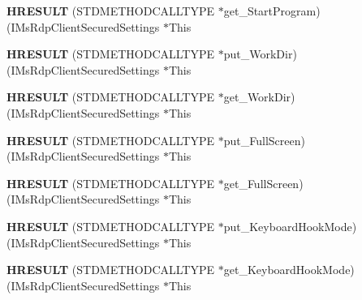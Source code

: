 \begin{DoxyCompactItemize}
{\bfseries H\+R\+E\+S\+U\+LT} (S\+T\+D\+M\+E\+T\+H\+O\+D\+C\+A\+L\+L\+T\+Y\+PE $\ast$get\+\_\+\+Start\+Program)(I\+Ms\+Rdp\+Client\+Secured\+Settings $\ast$This
\item 
\mbox{\label{struct_i_ms_rdp_client_secured_settings_vtbl_ac2a3462f8e8e1c1a7678fccba9072e39}} 
{\bfseries H\+R\+E\+S\+U\+LT} (S\+T\+D\+M\+E\+T\+H\+O\+D\+C\+A\+L\+L\+T\+Y\+PE $\ast$put\+\_\+\+Work\+Dir)(I\+Ms\+Rdp\+Client\+Secured\+Settings $\ast$This
\item 
\mbox{\label{struct_i_ms_rdp_client_secured_settings_vtbl_a52e1cd0fb7b14af48fbd1a7527a0b95c}} 
{\bfseries H\+R\+E\+S\+U\+LT} (S\+T\+D\+M\+E\+T\+H\+O\+D\+C\+A\+L\+L\+T\+Y\+PE $\ast$get\+\_\+\+Work\+Dir)(I\+Ms\+Rdp\+Client\+Secured\+Settings $\ast$This
\item 
\mbox{\label{struct_i_ms_rdp_client_secured_settings_vtbl_a1d6c095d501772f9c8d80d0cd5cbfc59}} 
{\bfseries H\+R\+E\+S\+U\+LT} (S\+T\+D\+M\+E\+T\+H\+O\+D\+C\+A\+L\+L\+T\+Y\+PE $\ast$put\+\_\+\+Full\+Screen)(I\+Ms\+Rdp\+Client\+Secured\+Settings $\ast$This
\item 
\mbox{\label{struct_i_ms_rdp_client_secured_settings_vtbl_a968e461d61add785407203ec1afaa147}} 
{\bfseries H\+R\+E\+S\+U\+LT} (S\+T\+D\+M\+E\+T\+H\+O\+D\+C\+A\+L\+L\+T\+Y\+PE $\ast$get\+\_\+\+Full\+Screen)(I\+Ms\+Rdp\+Client\+Secured\+Settings $\ast$This
\item 
\mbox{\label{struct_i_ms_rdp_client_secured_settings_vtbl_abe3be6d51cec2d2261766189e9dc6ee0}} 
{\bfseries H\+R\+E\+S\+U\+LT} (S\+T\+D\+M\+E\+T\+H\+O\+D\+C\+A\+L\+L\+T\+Y\+PE $\ast$put\+\_\+\+Keyboard\+Hook\+Mode)(I\+Ms\+Rdp\+Client\+Secured\+Settings $\ast$This
\item 
\mbox{\label{struct_i_ms_rdp_client_secured_settings_vtbl_aebd0a64b7be52e170254d4e9308d3152}} 
{\bfseries H\+R\+E\+S\+U\+LT} (S\+T\+D\+M\+E\+T\+H\+O\+D\+C\+A\+L\+L\+T\+Y\+PE $\ast$get\+\_\+\+Keyboard\+Hook\+Mode)(I\+Ms\+Rdp\+Client\+Secured\+Settings $\ast$This
\item 
\mbox{\label{struct_i_ms_rdp_client_secured_settings_vtbl_a709b6d83cfbdd125f300b5ef6fda1359}} 

\end{DoxyCompactItemize}
